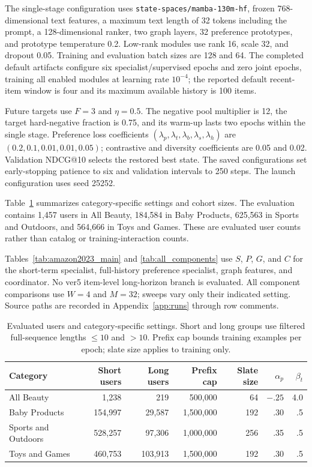 \documentclass[11pt]{article}
\begin{document}
The single-stage configuration uses \texttt{state-spaces/}\allowbreak\texttt{mamba-130m-hf}, frozen 768-dimensional text features, a maximum text length of 32 tokens including the prompt, a 128-dimensional ranker, two graph layers, 32 preference prototypes, and prototype temperature 0.2. Low-rank modules use rank 16, scale 32, and dropout 0.05. Training and evaluation batch sizes are 128 and 64. The completed default artifacts configure six specialist/supervised epochs and zero joint epochs, training all enabled modules at learning rate $10^{-4}$; the reported default recent-item window is four and its maximum available history is 100 items.

Future targets use $F=3$ and $\eta=0.5$. The negative pool multiplier is 12, the target hard-negative fraction is 0.75, and its warm-up lasts two epochs within the single stage. Preference loss coefficients $(\lambda_p,\lambda_t,\lambda_b,\lambda_s,\lambda_h)$ are $(0.2,0.1,0.01,0.01,0.05)$; contrastive and diversity coefficients are 0.05 and 0.02. Validation NDCG@10 selects the restored best state. The saved configurations set early-stopping patience to six and validation intervals to 250 steps. The launch configuration uses seed 25252.

Table~\ref{tab:config} summarizes category-specific settings and cohort sizes. The evaluation contains 1,457 users in All Beauty, 184,584 in Baby Products, 625,563 in Sports and Outdoors, and 564,666 in Toys and Games. These are evaluated user counts rather than catalog or training-interaction counts.

Tables~\ref{tab:amazon2023_main} and \ref{tab:all_components} use $S$, $P$, $G$, and $C$ for the short-term specialist, full-history preference specialist, graph features, and coordinator. No ver5 item-level long-horizon branch is evaluated. All component comparisons use $W=4$ and $M=32$; sweeps vary only their indicated setting. Source paths are recorded in Appendix~\ref{app:runs} through row comments.

\begin{table}[!t]
\centering
\begin{tabular}{lrrrrrr}
\toprule
Category & Short users & Long users & Prefix cap & Slate size & $\alpha_p$ & $\beta_t$\\
\midrule
All Beauty & 1,238 & 219 & 500,000 & 64 & $-.25$ & 4.0\\
Baby Products & 154,997 & 29,587 & 1,500,000 & 192 & .30 & .5\\
Sports and Outdoors & 528,257 & 97,306 & 1,000,000 & 256 & .35 & .5\\
Toys and Games & 460,753 & 103,913 & 1,500,000 & 192 & .30 & .5\\
\bottomrule
\end{tabular}
\caption{Evaluated users and category-specific settings. Short and long groups use filtered full-sequence lengths $\leq10$ and $>10$. Prefix cap bounds training examples per epoch; slate size applies to training only.}
\label{tab:config}
\end{table}
\end{document}
